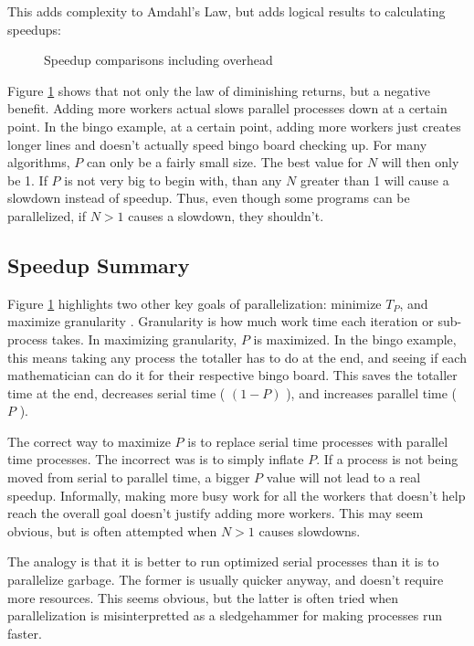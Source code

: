 This adds complexity to Amdahl's Law, but adds logical results to calculating speedups:

\begin{figure}[h]
	\begin{center}
		\caption{Speedup comparisons including overhead} 
		\label{amdahl_overhead_graph}
	\end{center}
\end{figure}

Figure \ref{amdahl_overhead_graph} shows that not only the law of diminishing returns, but a negative 
benefit. Adding more workers actual slows parallel processes down at a certain point. In the bingo example,
at a certain point, adding more workers just creates longer lines and doesn't actually speed bingo board 
checking up. For many algorithms, $ P $ can only be a fairly small size. The best value for $ N $ will then only be 1. If $ P $ is not very big to begin with, than any $ N $ greater than 1 will cause a slowdown instead 
of speedup. Thus, even though some programs can be parallelized, if $ N > 1 $ causes a slowdown, they 
shouldn't.


\subsection{Speedup Summary}
Figure \ref{amdahl_overhead_graph} highlights two other key goals of parallelization: minimize $ T_P $, and 
maximize \gls{granularity} \cite{mit}. Granularity is how much work time each iteration or sub-process takes. 
In maximizing \gls{granularity}, $ P $ is maximized. In the bingo example, this means taking any process the 
totaller has to do at the end, and seeing if each mathematician can do it for their respective bingo board. This
saves the totaller time at the end, decreases serial time ( $ (1 - P) $ ), and increases parallel time ( $ P $ ).

The correct way to maximize $ P $ is to replace serial time processes with parallel time processes. The 
incorrect was is to simply inflate $ P $. If a process is not being moved from serial to parallel time, a bigger
$ P $ value will not lead to a real speedup. Informally, making more busy work for all the workers that doesn't
help reach the overall goal doesn't justify adding more workers. This may seem obvious, but is often 
attempted when $ N > 1 $ causes slowdowns. 

The analogy is that it is better to run optimized serial processes than it is to parallelize garbage. The former is
usually quicker anyway, and doesn't require more resources. This seems obvious, but the latter is often 
tried when parallelization is misinterpretted as a sledgehammer for making processes run faster.
